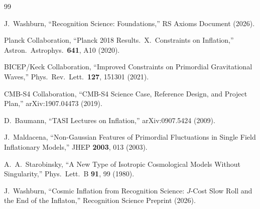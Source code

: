 \documentclass[12pt,a4paper]{article}
\theoremstyle{definition}
\theoremstyle{remark}
\begin{document}
\begin{thebibliography}{99}

J.~Washburn, ``Recognition Science: Foundations,''
RS Axioms Document (2026).

Planck Collaboration, ``Planck 2018 Results.\ X.\ Constraints
on Inflation,'' Astron.\ Astrophys.\ \textbf{641}, A10 (2020).

BICEP/Keck Collaboration, ``Improved Constraints on Primordial
Gravitational Waves,'' Phys.\ Rev.\ Lett.\ \textbf{127},
151301 (2021).

CMB-S4 Collaboration, ``CMB-S4 Science Case, Reference Design,
and Project Plan,'' arXiv:1907.04473 (2019).

D.~Baumann, ``TASI Lectures on Inflation,'' arXiv:0907.5424
(2009).

J.~Maldacena, ``Non-Gaussian Features of Primordial Fluctuations
in Single Field Inflationary Models,'' JHEP \textbf{2003}, 013
(2003).

A.~A.~Starobinsky, ``A New Type of Isotropic Cosmological
Models Without Singularity,'' Phys.\ Lett.\ B \textbf{91}, 99
(1980).

J.~Washburn, ``Cosmic Inflation from Recognition Science:
$J$-Cost Slow Roll and the End of the Inflaton,'' Recognition
Science Preprint (2026).

\end{thebibliography}
\end{document}
